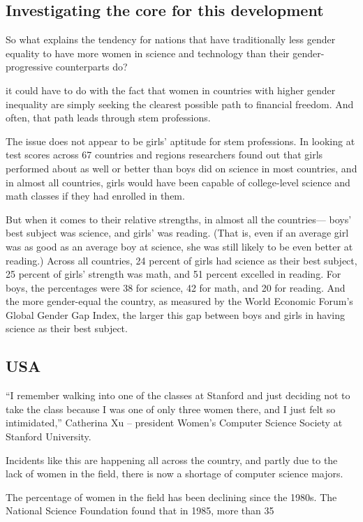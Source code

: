 	\subsection{Investigating the core for this development}
	So what explains the tendency for nations that have traditionally less gender equality to have more women in science and technology than their gender-progressive counterparts do?
	
	it could have to do with the fact that women in countries with higher gender inequality are simply seeking the clearest possible path to financial freedom. And often, that path leads through stem professions.
	
	The issue does not appear to be girls’ aptitude for stem professions. In looking at test scores across 67 countries and regions researchers found out that girls performed about as well or better than boys did on science in most countries, and in almost all countries, girls would have been capable of college-level science and math classes if they had enrolled in them.
	
	But when it comes to their relative strengths, in almost all the countries— boys’ best subject was science, and girls’ was reading. (That is, even if an average girl was as good as an average boy at science, she was still likely to be even better at reading.) Across all countries, 24 percent of girls had science as their best subject, 25 percent of girls’ strength was math, and 51 percent excelled in reading. For boys, the percentages were 38 for science, 42 for math, and 20 for reading. And the more gender-equal the country, as measured by the World Economic Forum’s Global Gender Gap Index, the larger this gap between boys and girls in having science as their best subject.
	
	\subsection{USA}
	
	“I remember walking into one of the classes at Stanford and just deciding not to take the class because I was one of only three women there, and I just felt so intimidated,”
	Catherina Xu – president Women’s Computer Science Society at Stanford University.
	
	Incidents like this are happening all across the country, and partly due to the lack of women in the field, there is now a shortage of computer science majors.
	
	The percentage of women in the field has been declining since the 1980s. The National Science Foundation found that in 1985, more than 35%
	

